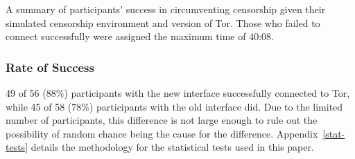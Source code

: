 \documentclass[USenglish,oneside,twocolumn]{article}
\begin{document}
{\begin{table}
\centering

\caption{
A summary of participants' success in circumventing censorship
given their simulated censorship environment and version of Tor. Those who
failed to connect successfully were assigned the maximum time of 40:08.
}
\label{table:participant-summary}
\end{table}

\subsubsection{Rate of Success} 
49 of 56 (88\%) participants with the new interface successfully connected to Tor, while 45 of 58 (78\%) participants with the old interface did. Due to the limited number of participants, this difference is not large enough to rule out the possibility of random chance being the cause for the difference. Appendix~\ref{stat-tests} details the methodology for the statistical tests used in this paper. 




}
\end{document}
